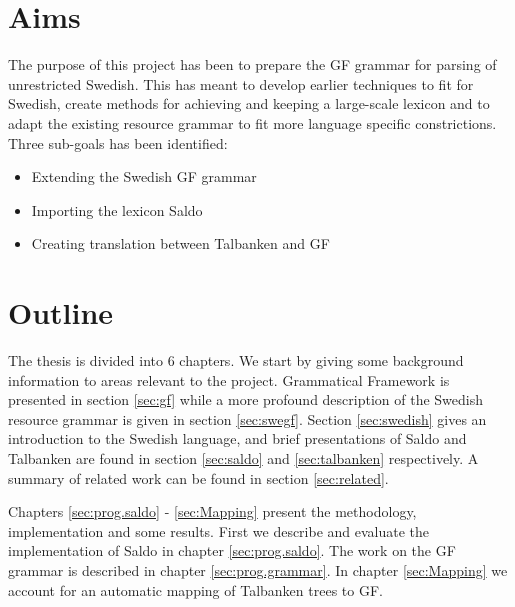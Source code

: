 \documentclass{report}
\begin{document}
\newpage %

\section{Aims}
\protect\thispagestyle{plain}
The purpose of this project has been to prepare the GF grammar for parsing of 
unrestricted Swedish.
This has meant to develop earlier techniques to fit for Swedish, create methods
for achieving and keeping a large-scale lexicon and to adapt the existing
resource grammar to fit more language specific constrictions.
Three sub-goals has been identified:
\begin{itemize}
\item Extending the Swedish GF grammar
\item Importing the lexicon Saldo
\item Creating translation between Talbanken and GF
\end{itemize}

\section{Outline}
The thesis is divided into 6 chapters. We start by giving some background
information to areas relevant to the project. %
Grammatical Framework is presented in section \ref{sec:gf} while a more profound
description of the Swedish resource grammar is given in section \ref{sec:swegf}.
Section \ref{sec:swedish} gives an introduction to the Swedish language, and
brief presentations of Saldo and Talbanken are found in section \ref{sec:saldo} and
\ref{sec:talbanken} respectively.
A summary of related work can be found in section \ref{sec:related}.

Chapters \ref{sec:prog.saldo} - \ref{sec:Mapping} present the methodology,
implementation and some results. First we describe and evaluate the implementation
of Saldo in chapter \ref{sec:prog.saldo}. The work on the GF grammar is described in
chapter \ref{sec:prog.grammar}.
In chapter \ref{sec:Mapping} we account for an automatic mapping of Talbanken
trees to GF. %
\end{document}
